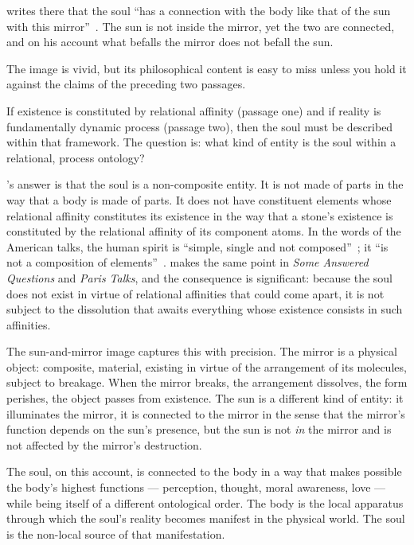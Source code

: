\AbdulBaha writes there that the soul ``has a connection with the body like
that of the sun with this mirror''~\citep[Ch.~68]{SAQ}. The sun is not inside
the mirror, yet the two are connected, and on his account what befalls the
mirror does not befall the sun.

The image is vivid, but its philosophical content is easy to miss unless
you hold it against the claims of the preceding two passages.

If existence is constituted by relational affinity (passage one) and if
reality is fundamentally dynamic process (passage two), then the soul must
be described within that framework.
The question is: what kind of entity is the soul within a relational,
process ontology?

\AbdulBaha's answer is that the soul is a non-composite entity.
It is not made of parts in the way that a body is made of parts.
It does not have constituent elements whose relational affinity constitutes
its existence in the way that a stone's existence is constituted by the
relational affinity of its component atoms.
In the words of the American talks, the human spirit is ``simple, single and
not composed''~\citep[Talk~100]{PUP}; it ``is not a composition of
elements''~\citep[Talk~85]{PUP}.
\AbdulBaha makes the same point in \textit{Some Answered Questions} and
\textit{Paris Talks}, and the consequence is significant: because the soul does not exist in
virtue of relational affinities that could come apart, it is not subject
to the dissolution that awaits everything whose existence consists in
such affinities.

The sun-and-mirror image captures this with precision.
The mirror is a physical object: composite, material, existing in virtue
of the arrangement of its molecules, subject to breakage.
When the mirror breaks, the arrangement dissolves, the form perishes,
the object passes from existence.
The sun is a different kind of entity: it illuminates the mirror, it is
connected to the mirror in the sense that the mirror's function depends
on the sun's presence, but the sun is not \emph{in} the mirror and is
not affected by the mirror's destruction.

The soul, on this account, is connected to the body in a way that makes
possible the body's highest functions --- perception, thought, moral
awareness, love --- while being itself of a different ontological order.
The body is the local apparatus through which the soul's reality becomes
manifest in the physical world.
The soul is the non-local source of that manifestation.

